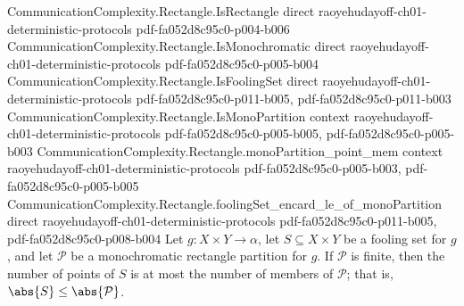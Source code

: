 \begin{theorem}
\label{CommunicationComplexity.Rectangle.foolingSet_ncard_le_of_monoPartition}
\leanok
{}
\proofstep
  {CommunicationComplexity.Rectangle.IsRectangle}
  {direct}
  {raoyehudayoff-ch01-deterministic-protocols}
  {pdf-fa052d8c95c0-p004-b006}
\proofstep
  {CommunicationComplexity.Rectangle.IsMonochromatic}
  {direct}
  {raoyehudayoff-ch01-deterministic-protocols}
  {pdf-fa052d8c95c0-p005-b004}
\proofstep
  {CommunicationComplexity.Rectangle.IsFoolingSet}
  {direct}
  {raoyehudayoff-ch01-deterministic-protocols}
  {pdf-fa052d8c95c0-p011-b005,
    pdf-fa052d8c95c0-p011-b003}
\proofstep
  {CommunicationComplexity.Rectangle.IsMonoPartition}
  {context}
  {raoyehudayoff-ch01-deterministic-protocols}
  {pdf-fa052d8c95c0-p005-b005,
    pdf-fa052d8c95c0-p005-b003}
\proofstep
  {CommunicationComplexity.Rectangle.monoPartition_point_mem}
  {context}
  {raoyehudayoff-ch01-deterministic-protocols}
  {pdf-fa052d8c95c0-p005-b003,
    pdf-fa052d8c95c0-p005-b005}
\proofstep
  {CommunicationComplexity.Rectangle.foolingSet_encard_le_of_monoPartition}
  {direct}
  {raoyehudayoff-ch01-deterministic-protocols}
  {pdf-fa052d8c95c0-p011-b005,
    pdf-fa052d8c95c0-p008-b004}
Let $g : X \times Y \to \alpha$, let $S \subseteq X \times Y$ be a fooling set for $g$,
and let $\mathcal{P}$ be a monochromatic rectangle partition for $g$. If $\mathcal{P}$
is finite, then the number of points of $S$ is at most the number of members of
$\mathcal{P}$; that is, $\abs{S} \le \abs{\mathcal{P}}$.
\end{theorem}
